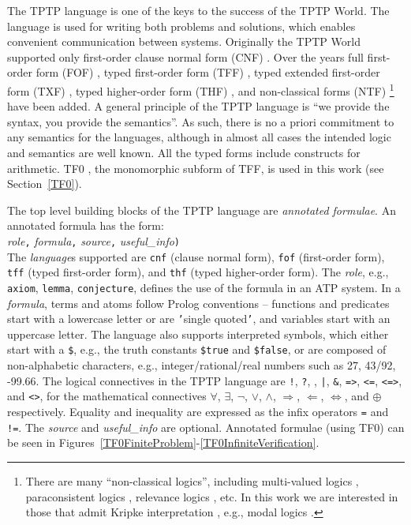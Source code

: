 \documentclass{easychair}
\newcommand{\smalltt}[1]{\small \texttt{#1}}
\begin{document}
The TPTP language \cite{Sut22-IGPL} is one of the keys to the success of the TPTP World.
The language is used for writing both problems and solutions,
which enables convenient communication between systems. 
Originally the TPTP World supported only first-order clause normal form (CNF)
\cite{SS98-JAR}.
Over the years full first-order form (FOF)
\cite{Sut09}, 
typed first-order form (TFF)
\cite{SS+12,BP13-TFF1}, 
typed extended first-order form (TXF)
\cite{SK18}, 
typed higher-order form (THF)
\cite{SB10,KSR16}, 
and non-classical forms (NTF)
\footnote{%
There are many ``non-classical logics'', including multi-valued logics \cite{Aug17},
paraconsistent logics \cite{Pri02}, relevance logics \cite{AB75}, etc.
In this work we are interested in those that admit Kripke interpretation \cite{Kri63},
e.g., modal logics \cite{BBW06}.}
\cite{SF+22} 
have been added.
A general principle of the TPTP language is ``we provide the syntax, you provide the semantics''.
As such, there is no a priori commitment to any semantics for the languages, although in almost 
all cases the intended logic and semantics are well known.
All the typed forms include constructs for arithmetic.
TF0 \cite{SS+12}, the monomorphic subform of TFF, is used in this work (see Section~\ref{TF0}).

The top level building blocks of the TPTP language are {\em annotated formulae}.
An annotated formula has the form:\\
{\em role}{\tt ,}
{\em formula}{\tt ,}
{\em source}{\tt ,}
{\em useful\_info}{\tt )}\\
The {\em language}s supported are {\smalltt{cnf}} (clause normal form), {\smalltt{fof}}
(first-order form), {\smalltt{tff}} (typed first-order form), and {\smalltt{thf}}
(typed higher-order form).
The {\em role}, e.g., {\smalltt{axiom}}, {\smalltt{lemma}}, {\smalltt{conjecture}},
defines the use of the formula in an ATP system.
In a {\em formula}, terms and atoms follow Prolog conventions
-- functions and predicates start with a lowercase letter or are {\tt '}single quoted{\tt '}, and 
variables start with an uppercase letter.
The language also supports interpreted symbols, which either start with a {\tt \$}, e.g., 
the truth constants {\smalltt{\$true}} and {\smalltt{\$false}}, or are composed of 
non-alphabetic characters, e.g., integer/rational/real numbers such as 27, 43/92, -99.66.
The logical connectives in the TPTP language are
{\tt !}, {\tt ?}, {\tt {\raisebox{0.4ex}{\texttildelow}}}, {\tt |}, {\tt \&}, {\tt =>}, {\tt <=},
{\tt <=>}, and {\tt <{\raisebox{0.4ex}{\texttildelow}}>},
for the mathematical connectives
$\forall$, $\exists$, $\neg$, $\vee$, $\wedge$, $\Rightarrow$, $\Leftarrow$, $\Leftrightarrow$, 
and $\oplus$ respectively.
Equality and inequality are expressed as the infix operators {\tt =} and {\tt !=}.
The {\em source} and {\em useful\_info} are optional.
Annotated formulae (using TF0) can be seen in 
Figures~\ref{TF0FiniteProblem}-\ref{TF0InfiniteVerification}.
\end{document}
